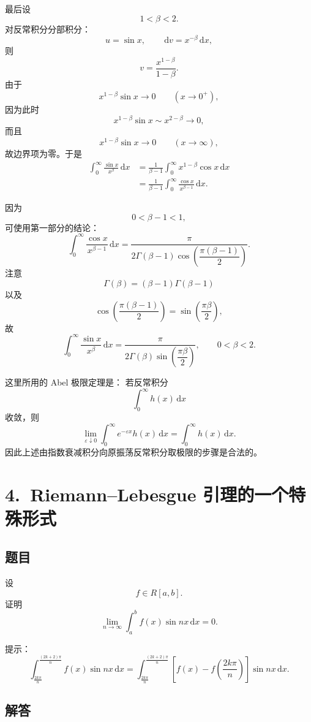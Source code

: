 \documentclass[12pt,a4paper]{ctexart}
\newcommand{\dd}{\,\mathrm d}
\begin{document}
最后设
\[
1<\beta<2.
\]
对反常积分分部积分：
\[
u=\sin x,
\qquad
\dd v=x^{-\beta}\dd x,
\]
则
\[
v=\frac{x^{1-\beta}}{1-\beta}.
\]
由于
\[
x^{1-\beta}\sin x\longrightarrow0
\qquad (x\to0^+),
\]
因为此时
\[
x^{1-\beta}\sin x\sim x^{2-\beta}\to0,
\]
而且
\[
x^{1-\beta}\sin x\longrightarrow0
\qquad (x\to\infty),
\]
故边界项为零。于是
\begin{align*}
\int_0^\infty
\frac{\sin x}{x^\beta}\dd x
&=
\frac1{\beta-1}
\int_0^\infty
x^{1-\beta}\cos x\dd x\\
&=
\frac1{\beta-1}
\int_0^\infty
\frac{\cos x}{x^{\beta-1}}\dd x.
\end{align*}

因为
\[
0<\beta-1<1,
\]
可使用第一部分的结论：
\[
\int_0^\infty
\frac{\cos x}{x^{\beta-1}}\dd x
=
\frac{\pi}
{2\Gamma(\beta-1)
\cos\left(\dfrac{\pi(\beta-1)}2\right)}.
\]
注意
\[
\Gamma(\beta)
=
(\beta-1)\Gamma(\beta-1)
\]
以及
\[
\cos\left(
\frac{\pi(\beta-1)}2
\right)
=
\sin\left(
\frac{\pi\beta}{2}
\right),
\]
故
\[
\boxed{
\int_0^\infty
\frac{\sin x}{x^\beta}\dd x
=
\frac{\pi}
{2\Gamma(\beta)
\sin\left(\dfrac{\pi\beta}{2}\right)},
\qquad 0<\beta<2.
}
\]

\medskip

这里所用的 Abel 极限定理是：
若反常积分
\[
\int_0^\infty h(x)\dd x
\]
收敛，则
\[
\lim_{\varepsilon\downarrow0}
\int_0^\infty e^{-\varepsilon x}h(x)\dd x
=
\int_0^\infty h(x)\dd x.
\]
因此上述由指数衰减积分向原振荡反常积分取极限的步骤是合法的。

\section*{4.\ Riemann--Lebesgue 引理的一个特殊形式}

\subsection*{题目}

设
\[
f\in R[a,b].
\]
证明
\[
\lim_{n\to\infty}
\int_a^b f(x)\sin nx\dd x=0.
\]

提示：
\[
\int_{\frac{2k\pi}{n}}^{\frac{(2k+2)\pi}{n}}
f(x)\sin nx\dd x
=
\int_{\frac{2k\pi}{n}}^{\frac{(2k+2)\pi}{n}}
\left[
f(x)-f\left(\frac{2k\pi}{n}\right)
\right]
\sin nx\dd x.
\]

\subsection*{解答}
\end{document}
